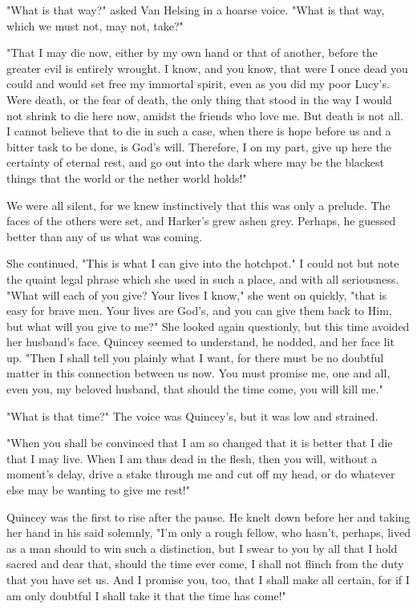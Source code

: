 "What is that way?" asked Van Helsing in a hoarse voice. "What is that way, which we must not, may not, take?" 

"That I may die now, either by my own hand or that of another, before the greater evil is entirely wrought. I know, and you know, that were I once dead you could and would set free my immortal spirit, even as you did my poor Lucy's. Were death, or the fear of death, the only thing that stood in the way I would not shrink to die here now, amidst the friends who love me. But death is not all. I cannot believe that to die in such a case, when there is hope before us and a bitter task to be done, is God's will. Therefore, I on my part, give up here the certainty of eternal rest, and go out into the dark where may be the blackest things that the world or the nether world holds!" 

We were all silent, for we knew instinctively that this was only a prelude. The faces of the others were set, and Harker's grew ashen grey. Perhaps, he guessed better than any of us what was coming. 

She continued, "This is what I can give into the hotchpot." I could not but note the quaint legal phrase which she used in such a place, and with all seriousness. "What will each of you give? Your lives I know," she went on quickly, "that is easy for brave men. Your lives are God's, and you can give them back to Him, but what will you give to me?" She looked again questionly, but this time avoided her husband's face. Quincey seemed to understand, he nodded, and her face lit up. "Then I shall tell you plainly what I want, for there must be no doubtful matter in this connection between us now. You must promise me, one and all, even you, my beloved husband, that should the time come, you will kill me." 

"What is that time?" The voice was Quincey's, but it was low and strained. 

"When you shall be convinced that I am so changed that it is better that I die that I may live. When I am thus dead in the flesh, then you will, without a moment's delay, drive a stake through me and cut off my head, or do whatever else may be wanting to give me rest!" 

Quincey was the first to rise after the pause. He knelt down before her and taking her hand in his said solemnly, "I'm only a rough fellow, who hasn't, perhaps, lived as a man should to win such a distinction, but I swear to you by all that I hold sacred and dear that, should the time ever come, I shall not flinch from the duty that you have set us. And I promise you, too, that I shall make all certain, for if I am only doubtful I shall take it that the time has come!" 

